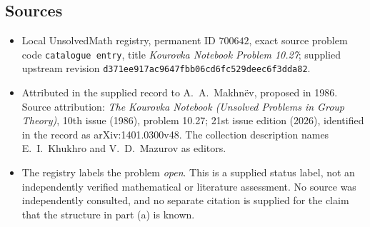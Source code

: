 \documentclass[11pt]{article}
\begin{document}
\subsection{Sources}
\begin{itemize}
\item Local UnsolvedMath registry, permanent ID \(700642\), exact source problem code \texttt{catalogue entry}, title \emph{Kourovka Notebook Problem 10.27}; supplied upstream revision \texttt{d371ee917ac9647fbb06cd6fc529deec6f3dda82}.
\item Attributed in the supplied record to A.~A.~Makhn\"ev, proposed in 1986. Source attribution: \emph{The Kourovka Notebook (Unsolved Problems in Group Theory)}, 10th issue (1986), problem 10.27; 21st issue edition (2026), identified in the record as arXiv:1401.0300v48. The collection description names E.~I.~Khukhro and V.~D.~Mazurov as editors.
\item The registry labels the problem \emph{open}. This is a supplied status label, not an independently verified mathematical or literature assessment. No source was independently consulted, and no separate citation is supplied for the claim that the structure in part (a) is known.
\end{itemize}
\end{document}
